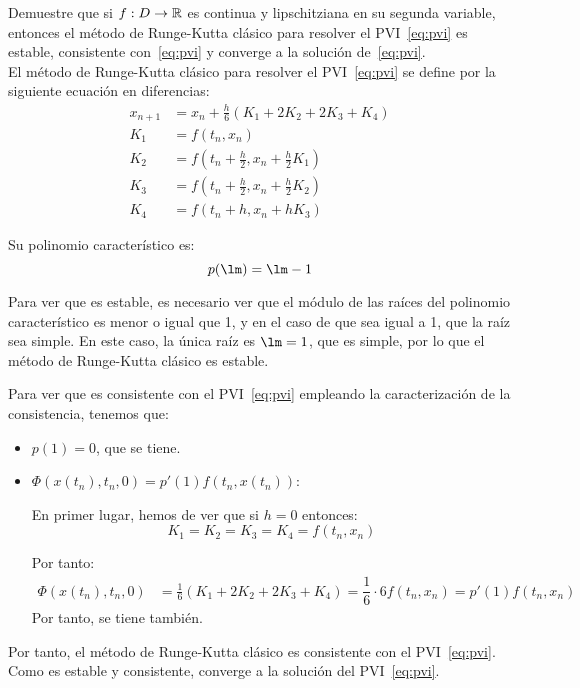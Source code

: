 \begin{ejercicio}\label{ej:3.1.5}
    Demuestre que si $f : D \to \mathbb{R}$ es continua y lipschitziana en su segunda variable, entonces el método de Runge-Kutta clásico para resolver el PVI~\eqref{eq:pvi} es estable, consistente con~\eqref{eq:pvi} y converge a la solución de~\eqref{eq:pvi}.\\

    El método de Runge-Kutta clásico para resolver el PVI~\eqref{eq:pvi} se define por la siguiente ecuación en diferencias:
    \begin{align*}
        x_{n+1} &= x_n + \frac{h}{6} \left( K_1 + 2K_2 + 2K_3 + K_4 \right)\\
        K_1 &= f(t_n, x_n) \\
        K_2 &= f\left(t_n + \frac{h}{2}, x_n + \frac{h}{2} K_1\right) \\
        K_3 &= f\left(t_n + \frac{h}{2}, x_n + \frac{h}{2} K_2\right) \\
        K_4 &= f(t_n + h, x_n + h K_3)
    \end{align*}

    Su polinomio característico es:
    \begin{equation*}
        p(\lm) = \lm - 1
    \end{equation*}

    Para ver que es estable, es necesario ver que el módulo de las raíces del polinomio característico es menor o igual que 1, y en el caso de que sea igual a 1, que la raíz sea simple. En este caso, la única raíz es $\lm = 1$, que es simple, por lo que el método de Runge-Kutta clásico es estable.

    Para ver que es consistente con el PVI~\eqref{eq:pvi} empleando la caracterización de la consistencia, tenemos que:
    \begin{itemize}
        \item $p(1)= 0$, que se tiene.
        \item $\Phi(x(t_n), t_n, 0)=p'(1)f(t_n, x(t_n))$:
        
        En primer lugar, hemos de ver que si $h=0$ entonces:
        \begin{equation*}
            K_1 = K_2 = K_3 = K_4 = f(t_n, x_n)
        \end{equation*}

        Por tanto:
        \begin{align*}
            \Phi(x(t_n), t_n, 0) &= \frac{1}{6} \left( K_1 + 2K_2 + 2K_3 + K_4 \right) = \dfrac{1}{6}\cdot 6 f(t_n, x_n) = p'(1) f(t_n, x_n)
        \end{align*}
        Por tanto, se tiene también.
    \end{itemize}
    
    Por tanto, el método de Runge-Kutta clásico es consistente con el PVI~\eqref{eq:pvi}. Como es estable y consistente, converge a la solución del PVI~\eqref{eq:pvi}.
\end{ejercicio}

